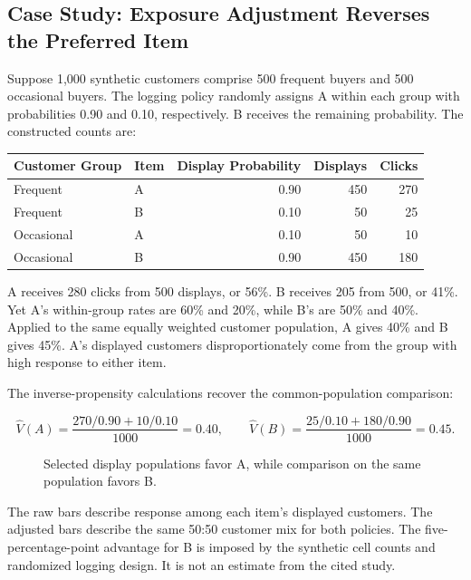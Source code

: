 \hypertarget{M06-case-study-exposure-adjustment-reverses-the-preferred-item}{%
\subsection{Case Study: Exposure Adjustment Reverses the Preferred
Item}\label{M06-case-study-exposure-adjustment-reverses-the-preferred-item}}

\noindent Suppose 1,000 synthetic customers comprise 500 frequent buyers and 500
occasional buyers. The logging policy randomly assigns A within each
group with probabilities 0.90 and 0.10, respectively. B receives the
remaining probability. The constructed counts are:

\begin{table}[H]
\centering\small
\begin{tabular}{@{}llrrr@{}}
\toprule
Customer Group & Item & Display Probability & Displays & Clicks \\
\midrule

Frequent & A & 0.90 & 450 & 270 \\
Frequent & B & 0.10 & 50 & 25 \\
Occasional & A & 0.10 & 50 & 10 \\
Occasional & B & 0.90 & 450 & 180 \\
\bottomrule
\end{tabular}
\end{table}

A receives 280 clicks from 500 displays, or 56\%. B receives 205 from
500, or 41\%. Yet A's within-group rates are 60\% and 20\%, while B's
are 50\% and 40\%. Applied to the same equally weighted customer
population, A gives 40\% and B gives 45\%. A's displayed customers
disproportionately come from the group with high response to either
item.

The inverse-propensity calculations recover the common-population
comparison:

\[
\widehat V(A)=\frac{270/0.90+10/0.10}{1000}=0.40,
\qquad
\widehat V(B)=\frac{25/0.10+180/0.90}{1000}=0.45.
\]

\begin{figure}[htbp]
\centering

\caption{Selected display populations favor A, while comparison on the same population favors B.}\label{fig:M06_exposure_reversal}
\end{figure}

The raw bars describe response among each item's displayed customers.
The adjusted bars describe the same 50:50 customer mix for both
policies. The five-percentage-point advantage for B is imposed by the
synthetic cell counts and randomized logging design. It is not an
estimate from the cited study.

